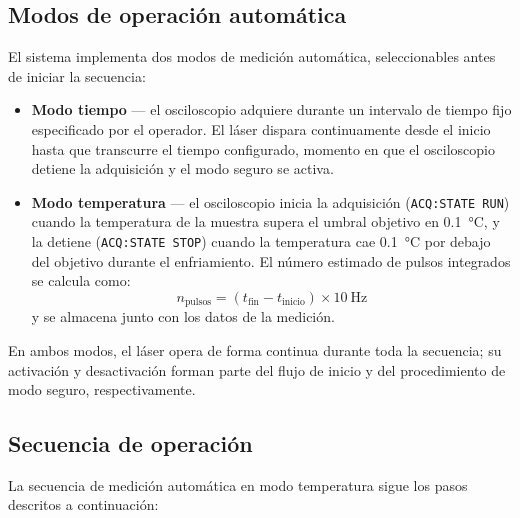 \subsection*{Modos de operación automática}

El sistema implementa dos modos de medición automática, seleccionables
antes de iniciar la secuencia:

\begin{itemize}
    \item \textbf{Modo tiempo} — el osciloscopio adquiere durante un
    intervalo de tiempo fijo especificado por el operador. El láser
    dispara continuamente desde el inicio hasta que transcurre el
    tiempo configurado, momento en que el osciloscopio detiene la
    adquisición y el modo seguro se activa.

    \item \textbf{Modo temperatura} — el osciloscopio inicia la
    adquisición (\texttt{ACQ:STATE RUN}) cuando la temperatura de la
    muestra supera el umbral objetivo en \SI{0.1}{\celsius}, y la
    detiene (\texttt{ACQ:STATE STOP}) cuando la temperatura cae
    \SI{0.1}{\celsius} por debajo del objetivo durante el enfriamiento.
    El número estimado de pulsos integrados se calcula como:
    \begin{equation}
        n_\text{pulsos} = (t_\text{fin} - t_\text{inicio}) \times
        \SI{10}{\hertz}
        \label{eq:pulsos_estimados}
    \end{equation}
    y se almacena junto con los datos de la medición.
\end{itemize}

En ambos modos, el láser opera de forma continua durante toda la
secuencia; su activación y desactivación forman parte del flujo
de inicio y del procedimiento de modo seguro, respectivamente.

\subsection*{Secuencia de operación}

La secuencia de medición automática en modo temperatura sigue los
pasos descritos a continuación:


